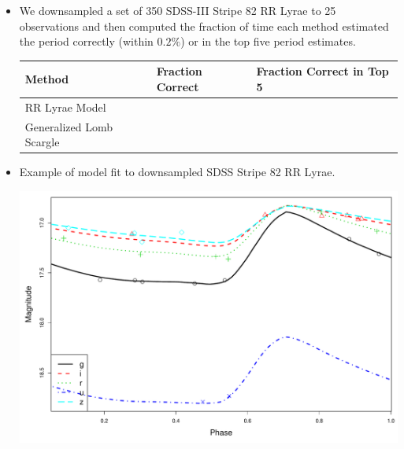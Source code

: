 \documentclass[a0,portrait]{a0poster}
\begin{document}
\begin{multicols}{2}
\begin{itemize}
\item We downsampled a set of 350 SDSS-III Stripe 82 RR Lyrae to 25 observations and then computed the fraction of time each method estimated the period correctly (within $0.2\%$) or in the top five period estimates.

\begin{center}
\begin{tabular}{l l l}
\toprule
\textbf{Method} & \textbf{Fraction Correct} & \textbf{Fraction Correct in Top 5}\\
\midrule
RR Lyrae Model  &  &  \\
Generalized Lomb Scargle &  &  \\
\bottomrule
\end{tabular}
\end{center}

\item Example of model fit to downsampled SDSS Stripe 82 RR Lyrae.

\begin{center}\vspace{1cm}
\includegraphics[width=0.7\linewidth]{1_one.pdf}
\end{center}\vspace{1cm}






\end{itemize}
\end{multicols}
\end{document}
